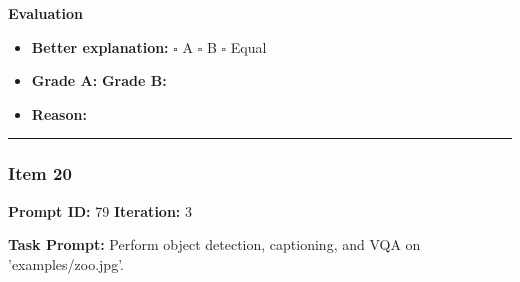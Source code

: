 \documentclass[11pt]{article}
\begin{document}
\vspace{1em}

\textbf{Evaluation}
\begin{itemize}
    \item \textbf{Better explanation:} \hspace{1em} $\square$ A \hspace{1em} $\square$ B \hspace{1em} $\square$ Equal
    \item \textbf{Grade A:} \underline{\hspace{2cm}} \hspace{1em} \textbf{Grade B:} \underline{\hspace{2cm}}
    \item \textbf{Reason:} \\[4.5em]
\end{itemize}

\vspace{1em}
\hrule
\vspace{1em}


\subsubsection*{Item 20}
\textbf{Prompt ID:} 79 \hfill \textbf{Iteration:} 3

\textbf{Task Prompt:} Perform object detection, captioning, and VQA on 'examples/zoo.jpg'.
\end{document}
